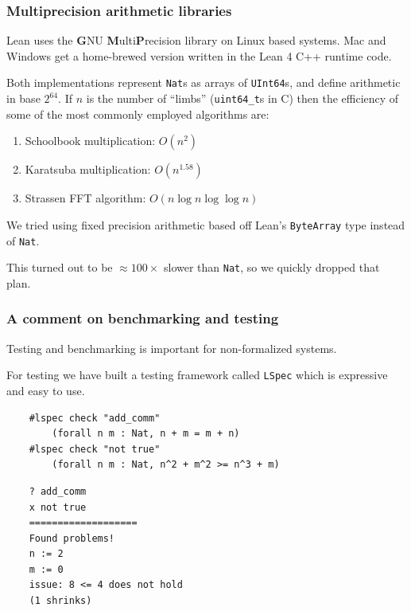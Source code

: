 \documentclass[options]{beamer}
\begin{document}
\begin{frame}[fragile]
    \frametitle{Multiprecision arithmetic libraries}

    Lean uses the {\bf G}NU {\bf M}ulti{\bf P}recision library on Linux based systems. Mac and Windows get a home-brewed version written in the Lean 4 C++ runtime code.

    \vspace{6pt}
    \pause

    Both implementations represent \verb+Nat+s as arrays of \verb+UInt64+s, and define arithmetic in base $2^{64}$. If $n$ is the number of ``limbs'' (\verb+uint64_t+s in C) then the efficiency of some of the most commonly employed algorithms are:

    \begin{enumerate}
        \item Schoolbook multiplication: $O(n^2)$

        \item Karatsuba multiplication: $O(n^{1.58})$
              
        \item Strassen FFT algorithm: $O(n \log n \log \log n)$
    \end{enumerate}

    \vspace{6pt}
    \pause

    We tried using fixed precision arithmetic based off Lean's \verb+ByteArray+ type instead of \verb+Nat+.

    This turned out to be $\approx 100 \times$ slower than \verb+Nat+, so we quickly dropped that plan.

\end{frame}

\begin{frame}[fragile]
    \frametitle{A comment on benchmarking and testing}

    Testing and benchmarking is important for non-formalized systems.

    For testing we have built a testing framework called \verb+LSpec+ which is expressive and easy to use.

    \pause
    \vspace{6pt}

    \begin{verbatim}
    #lspec check "add_comm"
        (forall n m : Nat, n + m = m + n)
    #lspec check "not true" 
        (forall n m : Nat, n^2 + m^2 >= n^3 + m)
    \end{verbatim}

    \vspace{6pt}

    \begin{verbatim}
    ? add_comm
    x not true
    ===================
    Found problems!
    n := 2
    m := 0
    issue: 8 <= 4 does not hold
    (1 shrinks)
    \end{verbatim}
\end{frame}
\end{document}

